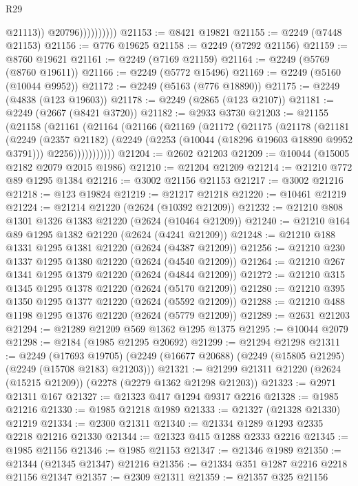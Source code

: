 \begin{lexlean}{R29}
\begin{coremodule}
                            @21113))
                        @20796))))))))))
@21153 := @8421 @19821
@21155 := @2249 (@7448 @21153)
@21156 := @776 @19625
@21158 := @2249 (@7292 @21156)
@21159 := @8760 @19621
@21161 := @2249 (@7169 @21159)
@21164 := @2249 (@5769 (@8760 @19611))
@21166 := @2249 (@5772 @15496)
@21169 := @2249 (@5160 (@10044 @9952))
@21172 := @2249 (@5163 (@776 @18890))
@21175 := @2249 (@4838 (@123 @19603))
@21178 := @2249 (@2865 (@123 @2107))
@21181 := @2249 (@2667 (@8421 @3720))
@21182 := @2933 @3730
@21203 := @21155
    (@21158
      (@21161
        (@21164
          (@21166
            (@21169
              (@21172
                (@21175
                  (@21178
                    (@21181
                      (@2249
                        (@2357 @21182)
                        (@2249 (@2253 (@10044 (@18296 @19603 @18890 @9952 @3791))) @2256)))))))))))
@21204 := @2602 @21203
@21209 := @10044 (@15005 @2182 @2079 @2015 @1986)
@21210 := @21204 @21209
@21214 := @21210 @772 @89 @1295 @1384
@21216 := @3002 @21156 @21153
@21217 := @3002 @21216
@21218 := @123 @19824
@21219 := @21217 @21218
@21220 := @10461 @21219
@21224 := @21214 @21220 (@2624 (@10392 @21209))
@21232 := @21210 @808 @1301 @1326 @1383 @21220 (@2624 (@10464 @21209))
@21240 := @21210 @164 @89 @1295 @1382 @21220 (@2624 (@4241 @21209))
@21248 := @21210 @188 @1331 @1295 @1381 @21220 (@2624 (@4387 @21209))
@21256 := @21210 @230 @1337 @1295 @1380 @21220 (@2624 (@4540 @21209))
@21264 := @21210 @267 @1341 @1295 @1379 @21220 (@2624 (@4844 @21209))
@21272 := @21210 @315 @1345 @1295 @1378 @21220 (@2624 (@5170 @21209))
@21280 := @21210 @395 @1350 @1295 @1377 @21220 (@2624 (@5592 @21209))
@21288 := @21210 @488 @1198 @1295 @1376 @21220 (@2624 (@5779 @21209))
@21289 := @2631 @21203
@21294 := @21289 @21209 @569 @1362 @1295 @1375
@21295 := @10044 @2079
@21298 := @2184 (@1985 @21295 @20692)
@21299 := @21294 @21298
@21311 := @2249
    (@17693 @19705)
    (@2249 (@16677 @20688) (@2249 (@15805 @21295) (@2249 (@15708 @2183) @21203)))
@21321 := @21299 @21311 @21220 (@2624 (@15215 @21209)) (@2278 (@2279 @1362 @21298 @21203))
@21323 := @2971 @21311 @167
@21327 := @21323 @417 @1294 @9317 @2216
@21328 := @1985 @21216
@21330 := @1985 @21218 @1989
@21333 := @21327 (@21328 @21330) @21219
@21334 := @2300 @21311
@21340 := @21334 @1289 @1293 @2335 @2218 @21216 @21330
@21344 := @21323 @415 @1288 @2333 @2216
@21345 := @1985 @21156
@21346 := @1985 @21153
@21347 := @21346 @1989
@21350 := @21344 (@21345 @21347) @21216
@21356 := @21334 @351 @1287 @2216 @2218 @21156 @21347
@21357 := @2309 @21311
@21359 := @21357 @325 @21156

\end{coremodule}
\end{lexlean}
